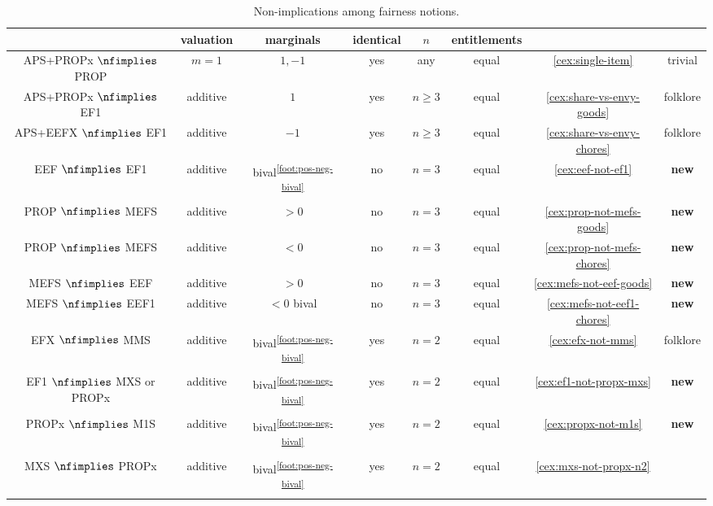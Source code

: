 \begin{table}[!htb]
\centering
\caption{Non-implications among fairness notions.}
\label{table:non-impls}
\footnotesize
\begin{tabular}{cccccccc}
\toprule & \tiny valuation & \tiny marginals & \tiny identical & \tiny $n$ & \tiny entitlements & &
\\ \midrule APS+PROPx $\nfimplies$ PROP
    & $m=1$ & $1, -1$ & yes & any & equal & \cref{cex:single-item} & trivial
\\[\defaultaddspace] APS+PROPx $\nfimplies$ EF1
    & additive & $1$ & yes & $n \ge 3$ & equal & \cref{cex:share-vs-envy-goods} & folklore
\\[\defaultaddspace] APS+EEFX $\nfimplies$ EF1
    & additive & $-1$ & yes & $n \ge 3$ & equal & \cref{cex:share-vs-envy-chores} & folklore
%
\\\midrule EEF $\nfimplies$ EF1
    & additive & bival\textsuperscript{\ref{foot:pos-neg-bival}}
    & no & $n=3$ & equal & \cref{cex:eef-not-ef1} & \textbf{new}
\\[\defaultaddspace] PROP $\nfimplies$ MEFS
    & additive & $> 0$ & no & $n=3$ & equal & \cref{cex:prop-not-mefs-goods} & \textbf{new}
\\[\defaultaddspace] PROP $\nfimplies$ MEFS
    & additive & $< 0$ & no & $n=3$ & equal & \cref{cex:prop-not-mefs-chores} & \textbf{new}
\\[\defaultaddspace] MEFS $\nfimplies$ EEF
    & additive & $> 0$ & no & $n=3$ & equal & \cref{cex:mefs-not-eef-goods} & \textbf{new}
\\[\defaultaddspace] MEFS $\nfimplies$ EEF1
    & additive & $< 0$ bival & no & $n=3$ & equal & \cref{cex:mefs-not-eef1-chores} & \textbf{new}
%
\\\midrule EFX $\nfimplies$ MMS
    & additive & bival\textsuperscript{\ref{foot:pos-neg-bival}}
    & yes & $n=2$ & equal & \cref{cex:efx-not-mms} & folklore
\\[\defaultaddspace] EF1 $\nfimplies$ MXS or PROPx
    & additive & bival\textsuperscript{\ref{foot:pos-neg-bival}}
    & yes & $n=2$ & equal & \cref{cex:ef1-not-propx-mxs} & \textbf{new}
\\[\defaultaddspace] PROPx $\nfimplies$ M1S
    & additive & bival\textsuperscript{\ref{foot:pos-neg-bival}}
    & yes & $n=2$ & equal & \cref{cex:propx-not-m1s} & \textbf{new}
\\[\defaultaddspace] MXS $\nfimplies$ PROPx
    & additive & bival\textsuperscript{\ref{foot:pos-neg-bival}}
    & yes & $n=2$ & equal & \cref{cex:mxs-not-propx-n2} & \cite{caragiannis2022existence}

\end{tabular}
\end{table}
